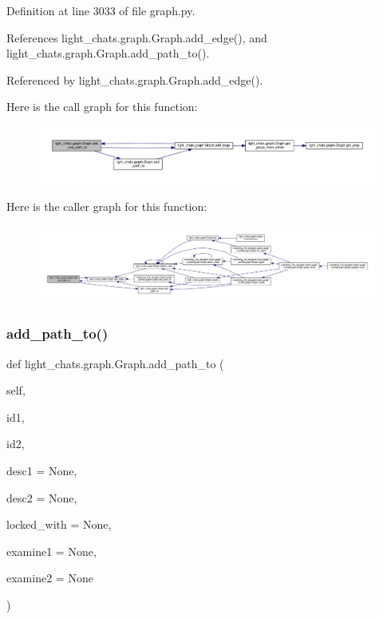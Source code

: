 Definition at line 3033 of file graph.\+py.



References light\+\_\+chats.\+graph.\+Graph.\+add\+\_\+edge(), and light\+\_\+chats.\+graph.\+Graph.\+add\+\_\+path\+\_\+to().



Referenced by light\+\_\+chats.\+graph.\+Graph.\+add\+\_\+edge().

Here is the call graph for this function\+:
\nopagebreak
\begin{figure}[H]
\begin{center}
\leavevmode
\includegraphics[width=350pt]{classlight__chats_1_1graph_1_1Graph_ae7da5d306e949414cc4df9d49bc0678d_cgraph}
\end{center}
\end{figure}
Here is the caller graph for this function\+:
\nopagebreak
\begin{figure}[H]
\begin{center}
\leavevmode
\includegraphics[width=350pt]{classlight__chats_1_1graph_1_1Graph_ae7da5d306e949414cc4df9d49bc0678d_icgraph}
\end{center}
\end{figure}
\mbox{\label{classlight__chats_1_1graph_1_1Graph_a4335de6c1c70dbbab982149a5c1e1586}} 
\subsubsection{\texorpdfstring{add\+\_\+path\+\_\+to()}{add\_path\_to()}}
{\footnotesize\ttfamily def light\+\_\+chats.\+graph.\+Graph.\+add\+\_\+path\+\_\+to (\begin{DoxyParamCaption}\item[{}]{self,  }\item[{}]{id1,  }\item[{}]{id2,  }\item[{}]{desc1 = {\ttfamily None},  }\item[{}]{desc2 = {\ttfamily None},  }\item[{}]{locked\+\_\+with = {\ttfamily None},  }\item[{}]{examine1 = {\ttfamily None},  }\item[{}]{examine2 = {\ttfamily None} }\end{DoxyParamCaption})}

